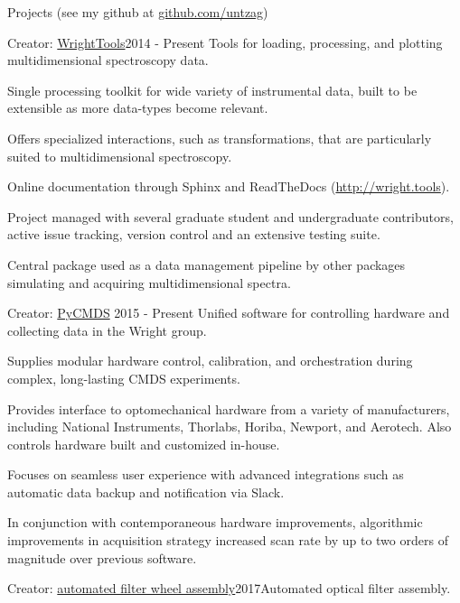 \documentclass{resume}  %
\begin{document}
\begin{rSection}{Projects (\MakeLowercase{see my github at}
    \href{https://github.com/untzag}{\MakeLowercase{github.com/untzag}})}
  \begin{rSubsection}{Creator: \href{http://wright.tools}{WrightTools}}{2014 - Present}
    {Tools for loading, processing, and plotting multidimensional spectroscopy data.}{}
    \item Single processing toolkit for wide variety of instrumental data, built to be extensible
      as more data-types become relevant.
    \item Offers specialized interactions, such as transformations, that are particularly suited to
      multidimensional spectroscopy.
    \item Online documentation through Sphinx and ReadTheDocs
      (\href{http://wright.tools}{http://wright.tools}).
    \item Project managed with several graduate student and undergraduate contributors, active
      issue tracking, version control and an extensive testing suite.
    \item Central package used as a data management pipeline by other packages simulating and
      acquiring multidimensional spectra.
  \end{rSubsection}
  \begin{rSubsection}{Creator: \href{https://github.com/wright-group/PyCMDS}{PyCMDS}}
    {2015 - Present}
    {Unified software for controlling hardware and collecting data in the Wright group.}{}
    \item Supplies modular hardware control, calibration, and orchestration during complex,
      long-lasting CMDS experiments.
    \item Provides interface to optomechanical hardware from a variety of manufacturers, including
      National Instruments, Thorlabs, Horiba, Newport, and Aerotech. Also controls hardware built
      and customized in-house.
    \item Focuses on seamless user experience with advanced integrations such as automatic data
      backup and notification via Slack.
    \item In conjunction with contemporaneous hardware improvements, algorithmic improvements in
      acquisition strategy increased scan rate by up to two orders of magnitude over previous
      software.
  \end{rSubsection}
  \begin{rSubsection}{Creator: \href{https://github.com/wright-group/FilterWheels}{automated filter
        wheel assembly}}{2017}{Automated optical filter assembly.}{}

\end{rSubsection}
\end{rSection}
\end{document}
